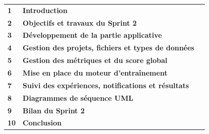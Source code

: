\begin{center}

\renewcommand{\arraystretch}{1.35}

\begin{tabular}{p{0.8cm}p{10.7cm}r}

\textbf{1}
&
\textbf{Introduction}
&
\pageref{sec:ch4-introduction}
\\[0.22cm]

\textbf{2}
&
\textbf{Objectifs et travaux du Sprint 2}
&
\pageref{sec:sprint2-objectifs}
\\[0.22cm]

\textbf{3}
&
\textbf{Développement de la partie applicative}
&
\pageref{sec:sprint2-developpement-applicatif}
\\[0.22cm]

\textbf{4}
&
\textbf{Gestion des projets, fichiers et types de données}
&
\pageref{sec:sprint2-projets-donnees}
\\[0.22cm]

\textbf{5}
&
\textbf{Gestion des métriques et du score global}
&
\pageref{sec:sprint2-evaluation}
\\[0.22cm]

\textbf{6}
&
\textbf{Mise en place du moteur d'entraînement}
&
\pageref{sec:sprint2-training-engine}
\\[0.22cm]

\textbf{7}
&
\textbf{Suivi des expériences, notifications et résultats}
&
\pageref{sec:sprint2-tracking-results}
\\[0.22cm]

\textbf{8}
&
\textbf{Diagrammes de séquence UML}
&
\pageref{sec:sprint2-uml}
\\[0.22cm]

\textbf{9}
&
\textbf{Bilan du Sprint 2}
&
\pageref{sec:sprint2-bilan}
\\[0.22cm]

\textbf{10}
&
\textbf{Conclusion}
&
\pageref{sec:ch4-conclusion}
\\[0.22cm]

\end{tabular}

\renewcommand{\arraystretch}{1}

\end{center}

\clearpage



